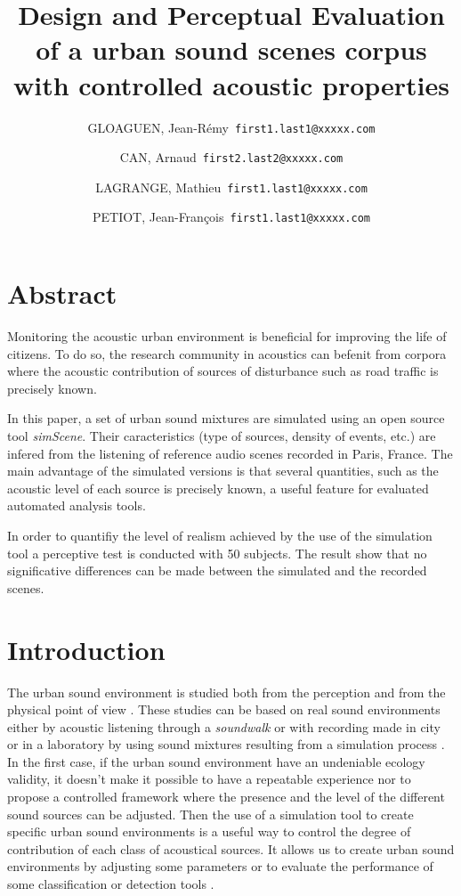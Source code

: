 \documentclass[a4,11pt,twocolumn]{article}
\title{Design and Perceptual Evaluation of a urban sound scenes corpus with controlled acoustic properties}     %
\author{
  GLOAGUEN, Jean-R\'emy\      \texttt{first1.last1@xxxxx.com}
  \and
  CAN, Arnaud\      \texttt{first2.last2@xxxxx.com}
  \and
  LAGRANGE, Mathieu\      \texttt{first1.last1@xxxxx.com}
  \and
  PETIOT, Jean-Fran\c cois\      \texttt{first1.last1@xxxxx.com}
}
\begin{document}
\maketitle

\section*{Abstract}

Monitoring the acoustic urban environment is beneficial for improving the life of citizens. To do so, the research community in acoustics can befenit from corpora where the acoustic contribution of sources of disturbance such as road traffic is precisely known.

In this paper, a set of urban sound mixtures are simulated using an open source tool \textit{simScene}. Their caracteristics (type of sources, density of events, etc.) are infered from the listening of reference audio scenes recorded in Paris, France. The main advantage of the simulated versions is that several quantities, such as the acoustic level of each source is precisely known, a useful feature for evaluated automated analysis tools.

In order to quantifiy the level of realism achieved by the use of the simulation tool a perceptive test is conducted with 50 subjects. The result show that no significative differences can be made between the simulated and the recorded scenes.

\section*{Introduction}

The urban sound environment is studied both from the perception \cite{jin_yong_soundwalk_2013} \cite{botteldooren_understanding_2011} and from the physical point of view \cite{can_describing_2015} \cite{raimbault_ambient_2003}. These studies can be based on real sound environments either by acoustic listening through a \textit{soundwalk} \cite{adams_soundwalking_2008} or with recording made in city \cite{botteldooren_temporal_2006} or in a laboratory by using sound mixtures resulting from a simulation process \cite{lafay_new_2014}. In the first case, if the urban sound environment have an undeniable ecology validity, it doesn't make it possible to have a repeatable experience nor to propose a controlled framework where the presence and the level of the different sound sources can be adjusted. Then the use of a simulation tool to create specific urban sound environments is a useful way to control the degree of contribution of each class of acoustical sources. It allows us to create urban sound environments by adjusting some parameters \cite{bruce_development_2009} or to evaluate the performance of some classification or detection tools \cite{giannoulis_detection_2013}.
\end{document}
